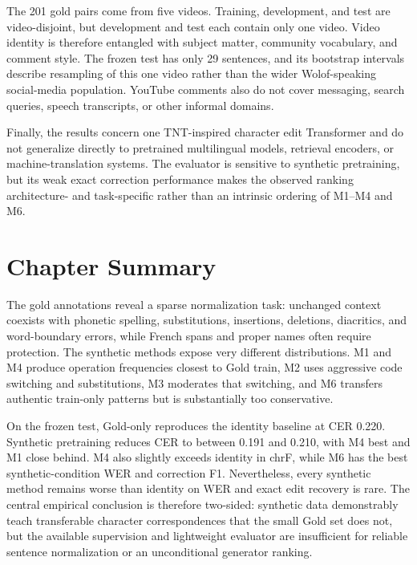 \documentclass[12pt, a4paper, twoside, openany]{report}
\begin{document}
The 201 gold pairs come from five videos. Training, development, and test are video-disjoint, but development and test each contain only one video. Video identity is therefore entangled with subject matter, community vocabulary, and comment style. The frozen test has only 29 sentences, and its bootstrap intervals describe resampling of this one video rather than the wider Wolof-speaking social-media population. YouTube comments also do not cover messaging, search queries, speech transcripts, or other informal domains.

Finally, the results concern one TNT-inspired character edit Transformer and do not generalize directly to pretrained multilingual models, retrieval encoders, or machine-translation systems. The evaluator is sensitive to synthetic pretraining, but its weak exact correction performance makes the observed ranking architecture- and task-specific rather than an intrinsic ordering of M1--M4 and M6.


\section{Chapter Summary}

The gold annotations reveal a sparse normalization task: unchanged context coexists with phonetic spelling, substitutions, insertions, deletions, diacritics, and word-boundary errors, while French spans and proper names often require protection. The synthetic methods expose very different distributions. M1 and M4 produce operation frequencies closest to Gold train, M2 uses aggressive code switching and substitutions, M3 moderates that switching, and M6 transfers authentic train-only patterns but is substantially too conservative.

On the frozen test, Gold-only reproduces the identity baseline at CER 0.220. Synthetic pretraining reduces CER to between 0.191 and 0.210, with M4 best and M1 close behind. M4 also slightly exceeds identity in chrF, while M6 has the best synthetic-condition WER and correction F1. Nevertheless, every synthetic method remains worse than identity on WER and exact edit recovery is rare. The central empirical conclusion is therefore two-sided: synthetic data demonstrably teach transferable character correspondences that the small Gold set does not, but the available supervision and lightweight evaluator are insufficient for reliable sentence normalization or an unconditional generator ranking.
\end{document}
